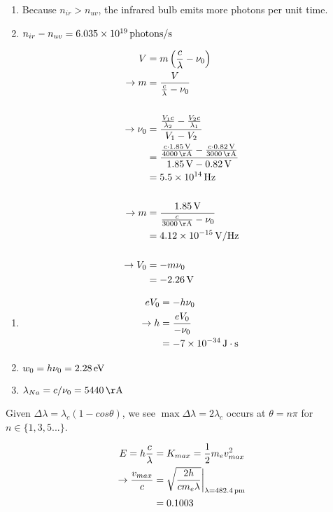 \documentclass[12pt]{article}
\begin{document}
\newpage
\begin{enumerate}[label=\alph{*})]
\item Because $n_{ir} > n_{uv}$, the infrared bulb emits more photons per unit time.
\item $n_{ir} - n_{uv} = \unit[6.035 \times 10^{19}]{photons/s}$
\end{enumerate}

\problem

\begin{align*}
V &= m\left(\frac{c}{\lambda} - \nu_0\right) \\
\to m &= \frac{V}{\frac{c}{\lambda} - \nu_0} \\
\\
\to \nu_0 &= \frac{\frac{V_1 c}{\lambda_2} - \frac{V_2 c}{\lambda_1}}{V_1 - V_2} \\
&= \frac{\frac{c \cdot \unit[1.85]{V}}{\unit[4000]{\AA}} - \frac{c \cdot \unit[0.82]{V}}{\unit[3000]{\AA}}}
{\unit[1.85]{V} - \unit[0.82]{V}} \\
&= \unit[5.5 \times 10^{14}]{Hz} \\
\\
\to m &= \frac{\unit[1.85]{V}}{\frac{c}{\unit[3000]{\AA}} - \nu_0} \\
&= \unit[4.12 \times 10^{-15}]{V/Hz} \\
\\
\to V_0 &= -m\nu_0\\
&= \unit[-2.26]{V}
\end{align*}

\begin{enumerate}[label=\alph{*})]
\item 
\begin{align*}
eV_0 &= -h\nu_0 \\
\to h &= \frac{eV_0}{-\nu_0} \\
&= \unit[-7 \times 10^{-34}]{J\cdot s}
\end{align*}

\item $w_0 = h\nu_0 = \unit[2.28]{eV}$

\item $\lambda_{Na} = c/\nu_0 = \unit[5440]{\AA}$
\end{enumerate}

\newpage

\problem
Given $\Delta \lambda = \lambda_c (1 - cos \theta)$, we see $\max \Delta \lambda = 2\lambda_c$ occurs at $\theta = n\pi$ for $n \in \{1,3,5...\}$.

\begin{align*}
E = h\frac{c}{\lambda} &= K_{max} = \frac{1}{2}m_ev_{max}^2 \\
\to \frac{v_{max}}{c} &= \sqrt{\frac{2h}{cm_e\lambda}}\biggr\rvert_{\lambda = \unit[482.4]{pm}} \\
&= 0.1003
\end{align*}
\end{document}
